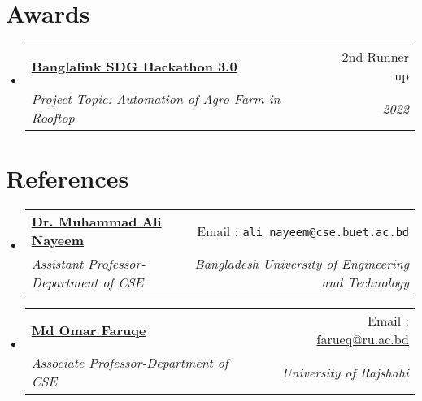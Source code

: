 \documentclass[a4paper,11pt]{article}
\makeatletter
\newcommand{\resumeSubheading}[4]{
    \vspace{-1pt}\item
    \begin{tabular*}{0.97\textwidth}{l@{\extracolsep{\fill}}r}
        \textbf{#1}       & #2                 \\
        \textit{\small#3} & \textit{\small #4} \\
    \end{tabular*}\vspace{-5pt}
}
\newcommand{\resumeSubHeadingListStart}{\begin{itemize}[leftmargin=*]}
\newcommand{\resumeSubHeadingListEnd}{\end{itemize}}
\makeatother
\begin{document}
\section{Awards}
\resumeSubHeadingListStart

\resumeSubheading
{\href{https://www.dhakatribune.com/business/2022/09/03/banglalink-sdg-hackathon-code-for-a-cause-30-finale-held}{Banglalink SDG Hackathon 3.0}}{2nd Runner up}
{Project Topic: Automation of Agro Farm in Rooftop}{2022}



\resumeSubHeadingListEnd


\section{References}
\resumeSubHeadingListStart

\resumeSubheading
{\href{https://cse.buet.ac.bd/faculty_list/detail/ali_nayeem}{Dr. Muhammad Ali Nayeem}}
{Email : \texttt{ali\_nayeem@cse.buet.ac.bd}}
{Assistant Professor-Department of CSE}
{Bangladesh University of Engineering and Technology}
\resumeSubHeadingListEnd
\resumeSubHeadingListStart

\resumeSubheading
{\href{http://rurfid.ru.ac.bd/ru_profile/public/teacher/22706111/profile}{Md Omar Faruqe}}{Email : \href{farueq@ru.ac.bd}{farueq@ru.ac.bd}}
{Associate Professor-Department of CSE}{University of Rajshahi}


\resumeSubHeadingListEnd
\end{document}
